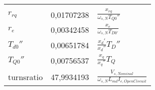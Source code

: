 \begin{longtable}[]{@{}lll@{}}
\begin{minipage}[t]{0.69\columnwidth}
\end{minipage}\tabularnewline
\begin{minipage}[t]{0.13\columnwidth}\raggedright
\(r_{rq}\)\strut
\end{minipage} & \begin{minipage}[t]{0.09\columnwidth}\raggedright
0,01707238\strut
\end{minipage} & \begin{minipage}[t]{0.69\columnwidth}\raggedright
\(\frac{x_{rq}}{\omega_{s,N}T_{Q0}''}\)\strut
\end{minipage}\tabularnewline
\begin{minipage}[t]{0.13\columnwidth}\raggedright
\(r_e\)\strut
\end{minipage} & \begin{minipage}[t]{0.09\columnwidth}\raggedright
0,00342458\strut
\end{minipage} & \begin{minipage}[t]{0.69\columnwidth}\raggedright
\(\frac{x_e}{\omega_{s,N}T_{D0'}}\)\strut
\end{minipage}\tabularnewline
\begin{minipage}[t]{0.13\columnwidth}\raggedright
\(T_{d0}''\)\strut
\end{minipage} & \begin{minipage}[t]{0.09\columnwidth}\raggedright
0,00651784\strut
\end{minipage} & \begin{minipage}[t]{0.69\columnwidth}\raggedright
\(\frac{x_d'}{x_d''}T_D''\)\strut
\end{minipage}\tabularnewline
\begin{minipage}[t]{0.13\columnwidth}\raggedright
\(T_{Q0}''\)\strut
\end{minipage} & \begin{minipage}[t]{0.09\columnwidth}\raggedright
0,00756537\strut
\end{minipage} & \begin{minipage}[t]{0.69\columnwidth}\raggedright
\(\frac{x_q}{x_q''}T_Q\)\strut
\end{minipage}\tabularnewline
\begin{minipage}[t]{0.13\columnwidth}\raggedright
turnsratio\strut
\end{minipage} & \begin{minipage}[t]{0.09\columnwidth}\raggedright
47,9934193\strut
\end{minipage} & \begin{minipage}[t]{0.69\columnwidth}\raggedright
\(\frac{V_{s,Nominal}}{\omega_{s,N}L_{md}I_{e,OpenCircuit}}\)\strut
\end{minipage}\tabularnewline
\bottomrule
\end{longtable}

